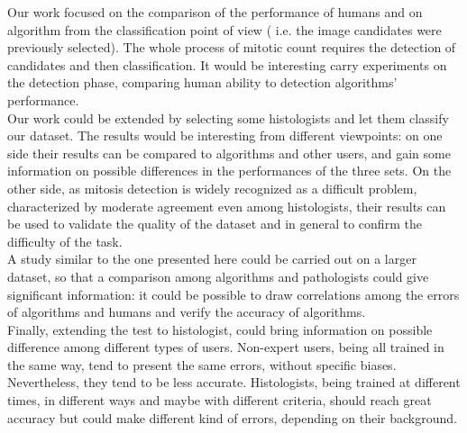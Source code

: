 Our work focused on the comparison of the performance of humans and on algorithm from the classification point of view ( i.e. the image candidates were previously selected).
The whole process of mitotic count requires the detection of candidates and then classification. It would be interesting carry experiments on the detection phase,
comparing human ability to detection algorithms' performance.\\
Our work could be extended by selecting some histologists and let them classify our dataset. The results would be interesting from different viewpoints: on one side their results
can be compared to algorithms and other users, and gain some information on possible differences in the performances of the three sets. On the other side, as 
mitosis detection is widely recognized as a difficult problem, characterized by moderate agreement even among histologists, their results can be used to validate the quality of the 
dataset and in general to confirm the difficulty of the task.\\
A study similar to the one presented here could be carried out on a larger dataset, so that a comparison among algorithms and pathologists could give significant information: 
it could be possible to draw correlations among the errors of algorithms and humans and verify the accuracy of algorithms.\\
Finally, extending the test to histologist, could bring information on possible difference among different types of users. Non-expert users, being all trained in the same way,
tend to present the same errors, without specific biases. Nevertheless, they tend to be less accurate. Histologists, being trained at different times, in different ways and
maybe with different criteria, should reach great accuracy but could make different kind of errors, depending on their background.




